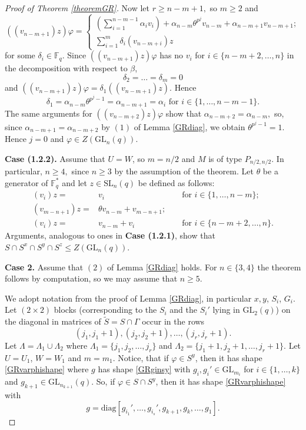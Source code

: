 \documentclass[a4paper,reqno,11pt]{amsart}
\theoremstyle{definition}
\theoremstyle{remark}
\numberwithin{equation}{section}
\newcommand{\diag}{\mathrm{diag}}
\newcommand{\SL}{{\mathrm{SL}}}
\newcommand{\GL}{{\mathrm{GL}}}
\begin{document}
\begin{proof}[Proof of Theorem {\rm \ref{theoremGR}}]
Now let $r\ge n-m+1,$ so $m\ge 2$ and 
\begin{equation*}((v_{n-m+1})z) \varphi=
\begin{cases}
\left(\sum_{i=1}^{n-m-1} \alpha_i v_i \right) + \alpha_{n-m} \theta^{p^j} v_{n-m} + \alpha_{n-m+1} v_{n-m+1};\\
\sum_{i=1}^m \delta_i (v_{n-m+i})z
\end{cases}
\end{equation*}
for some $\delta_i \in \mathbb{F}_q.$ Since $((v_{n-m+1})z) \varphi$ has no $v_i$ for $i \in \{n-m+2, \ldots, n\}$ in the decomposition with respect to $\beta$, 
$$\delta_2 = \ldots = \delta_m =0$$
and $((v_{n-m+1})z) \varphi= \delta_1 ((v_{n-m+1})z).$ Hence 
$$\delta_1 = \alpha_{n-m} \theta^{p^j-1}=\alpha_{n-m+1} = \alpha_i \text{ for } i \in \{1, \ldots, n-m-1\}.$$
The same arguments for $((v_{n-m+2})z) \varphi$ show that $\alpha_{n-m+2}=\alpha_{n-m},$ so, since $\alpha_{n-m+1}=\alpha_{n-m+2}$ by $(1)$ of Lemma \ref{GRdiag}, we obtain $\theta^{p^j-1}=1.$ Hence $j=0$ and $\varphi \in Z(\GL_n(q)).$
 



\medskip
{\bf Case (1.2.2).} Assume that $U=W$, so $m=n/2$ and $M$ is of type $P_{n/2,n/2}.$ In particular, $n \ge 4,$ since $n \ge 3$ by the assumption of the theorem.  Let $\theta$ be a generator of $\mathbb{F}_q^*$ and let $z \in \SL_n(q)$ be defined as follows: 
\begin{equation}
\label{GRzdef2}
\begin{aligned}
(v_i)z= &v_i &&\text{ for } i \in \{1, \ldots, n-m\}; \\
(v_{m-n+1})z= & \theta v_{n-m} + v_{m-n+1}; &&\\
(v_i)z= & v_{n-m} + v_{i} && \text{ for } i \in \{n-m+2, \ldots, n\}.
\end{aligned} 
\end{equation}
Arguments, analogous to  ones in {\bf Case (1.2.1)},  show that  $S \cap S^x \cap S^y \cap S^z \le Z(\GL_n(q))$.
\bigskip

{\bf Case 2.}  Assume that $(2)$ of Lemma \ref{GRdiag} holds.
 For $n \in \{3,4\}$ the theorem follows by computation, so  we may assume that $n \ge 5$.


We adopt notation from the proof of Lemma \ref{GRdiag}, in particular $x,y$, $S_i$, $G_i$.
Let $(2 \times 2)$ blocks (corresponding to the $S_i$ and the $S_i'$ lying in $\GL_2(q)$) on the diagonal in matrices of $\tilde{S}=S \cap \Gamma$ occur in the rows $$(j_1, j_1+1), (j_2, j_2 +1), \ldots, (j_r, j_r+1).$$ Let $\Lambda=\Lambda_1 \cup \Lambda_2$ where 
$\Lambda_1=\{j_1, j_2, \ldots, j_r\}$ and $\Lambda_2=\{j_1+1, j_2+1, \ldots, j_r+1\}.$
 Let $U=U_1$, $W=W_1$ and $m=m_1.$  
 Notice, that if $\varphi \in S^y$, then it has shape \eqref{GRvarphishape} where $g$ has shape \eqref{GRginsy} with $g_i, g_i' \in \GL_{m_i}$ for $i \in \{1, \ldots, k\}$ and $g_{k+1} \in \GL_{n_{k+1}}(q).$ So, if $\varphi \in S \cap S^y$, then it has shape \eqref{GRvarphishape} with 
 \begin{equation}
 \label{GRgdiagcase2}
 g = \diag[g_{i_1}', \ldots, g_{i_s}', g_{k+1}, g_k, \ldots, g_1].
 \end{equation}
 

\end{proof}
\end{document}
